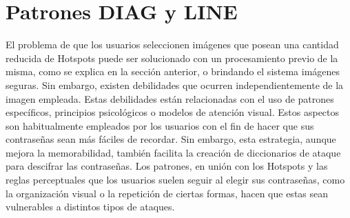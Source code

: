 \documentclass[12pt]{report}
\begin{document}
	

	
	
	
	

\section{Patrones DIAG y LINE}


El problema de que los usuarios seleccionen imágenes que posean una cantidad reducida de Hotspots puede ser solucionado con un procesamiento previo de la misma, como se explica en la sección anterior, o brindando el sistema imágenes seguras. Sin embargo, existen debilidades que ocurren independientemente de la imagen empleada. Estas debilidades están relacionadas con el uso de patrones específicos, principios psicológicos o modelos de atención visual. Estos aspectos son habitualmente empleados por los usuarios con el fin de hacer que sus contraseñas sean más fáciles de recordar. Sin embargo, esta estrategia, aunque mejora la memorabilidad, también facilita la creación de diccionarios de ataque para descifrar las contraseñas. Los patrones, en unión con los Hotspots y las reglas perceptuales que los usuarios suelen seguir al elegir sus contraseñas, como la organización visual o la repetición de ciertas formas, hacen que estas sean vulnerables a distintos tipos de ataques.


\end{document}
